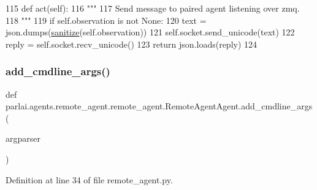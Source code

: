 \begin{DoxyCode}
115     \textcolor{keyword}{def }act(self):
116         \textcolor{stringliteral}{"""}
117 \textcolor{stringliteral}{        Send message to paired agent listening over zmq.}
118 \textcolor{stringliteral}{        """}
119         \textcolor{keywordflow}{if} self.observation \textcolor{keywordflow}{is} \textcolor{keywordflow}{not} \textcolor{keywordtype}{None}:
120             text = json.dumps(\hyperlink{namespaceparlai_1_1agents_1_1remote__agent_1_1remote__agent_a89751a1e0abc561f94b94db63d8ee2c4}{sanitize}(self.observation))
121             self.socket.send\_unicode(text)
122         reply = self.socket.recv\_unicode()
123         \textcolor{keywordflow}{return} json.loads(reply)
124 
\end{DoxyCode}
\mbox{\label{classparlai_1_1agents_1_1remote__agent_1_1remote__agent_1_1RemoteAgentAgent_ae58e61ee7d8f6373b38389b2e832924b}} 
\subsubsection{\texorpdfstring{add\+\_\+cmdline\+\_\+args()}{add\_cmdline\_args()}}
{\footnotesize\ttfamily def parlai.\+agents.\+remote\+\_\+agent.\+remote\+\_\+agent.\+Remote\+Agent\+Agent.\+add\+\_\+cmdline\+\_\+args (\begin{DoxyParamCaption}\item[{}]{argparser }\end{DoxyParamCaption})\hspace{0.3cm}{\ttfamily [static]}}



Definition at line 34 of file remote\+\_\+agent.\+py.


